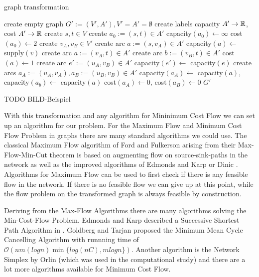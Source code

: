 \begin{algorithm}
 \caption{graph transformation}
 \label{algo:graphtransform}
 \begin{algorithmic}[5]
  \State create empty graph $G':=(V',A'), V'=A'=\emptyset$
  \State create labels capacity $A'\to \mathbb{R}$, cost $A'\to \mathbb{R}$%
  \State create $s, t\in V$ 
  \State create $a_0 :=(s,t) \in A'$
  \State capacity$(a_0)\gets\infty$ 
  \State cost$(a_0)\gets 2$ 
    \State create $v_A, v_B\in V'$
      \State create arc $a:=(s,v_A)\in A'$
      \State capacity$(a)\gets$ supply$(v)$
      \State create arc $a:=(v_A, t)\in A'$
      \State create arc $b:=(v_B,t)\in A'$
      \State cost$(a)\gets 1$
    \EndIf
  \EndFor
      \State create arc $e':=(u_A, v_B)\in A'$
      \State capacity$(e')\gets$ capacity$(e)$
    \Else
      \State create arcs $a_A:=(u_A, v_A), a_B:=(u_B, v_B)\in A'$
      \State capacity$(a_A)\gets$ capacity$(a)$, capacity$(a_b)\gets$ capacity$(a)$
      \State cost$(a_A)\gets 0$, cost$(a_B)\gets0$
    \EndIf
  \EndFor
  \Return $G'$
  \EndFunction
 \end{algorithmic}

\end{algorithm}

TODO BILD-Beispiel 

With this transformation and any algorithm for Mininimum Cost Flow we can set up an algorithm for our problem. 
For the Maximum Flow and Minimum Cost Flow Problem in graphs there are many standard algorithms we could use. The 
classical Maximum Flow algorithm of Ford and Fulkerson \cite{Ford-Fulkerson_algo} arising from their Max-Flow-Min-Cut 
theorem is based on augmenting flow on source-sink-paths in the network as well as the improved algorithms of Edmonds 
and Karp \cite{EdmondsKarp1972} or Dinic \cite{Dinic1970}. Algorithms for Maximum Flow can be used to first check if 
there is any feasible flow in the network. If there is no feasible flow we can give up at this point, while the flow 
problem on the transformed graph is always feasible by construction.

Deriving from the Max-Flow Algorithms there are many algorithms solving the Min-Cost-Flow Problem. Edmonds and 
Karp described a Successive Shortest Path Algorithm in \cite{EdmondsKarp1972}. Goldberg and Tarjan proposed the Minimum 
Mean Cycle Cancelling Algorithm \cite{minMeanCycleCancelling89} with runnning time of $\mathcal{O}(nm(log 
n)\min\{log(nC), m log n\}) $.%
Another algorithm is the Network Simplex by Orlin \cite{NetworkSimplexOrlin97} (which was used in the computational 
study) and there are a lot more algorithms available for Minimum Cost Flow.

